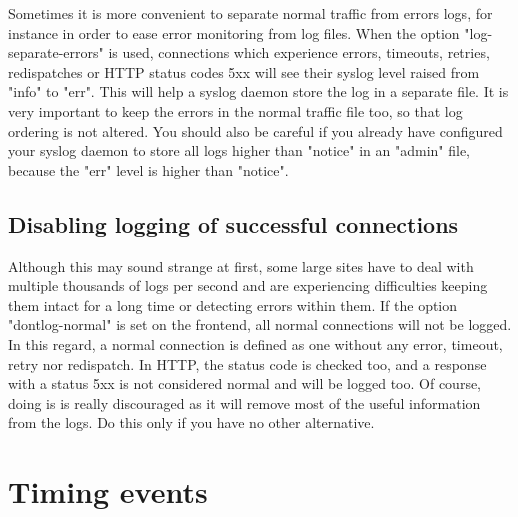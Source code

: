 Sometimes it is more convenient to separate normal traffic from errors logs,
for instance in order to ease error monitoring from log files. When the option
"log-separate-errors" is used, connections which experience errors, timeouts,
retries, redispatches or HTTP status codes 5xx will see their syslog level
raised from "info" to "err". This will help a syslog daemon store the log in
a separate file. It is very important to keep the errors in the normal traffic
file too, so that log ordering is not altered. You should also be careful if
you already have configured your syslog daemon to store all logs higher than
"notice" in an "admin" file, because the "err" level is higher than "notice".

\subsection{Disabling logging of successful connections}

Although this may sound strange at first, some large sites have to deal with
multiple thousands of logs per second and are experiencing difficulties keeping
them intact for a long time or detecting errors within them. If the option
"dontlog-normal" is set on the frontend, all normal connections will not be
logged. In this regard, a normal connection is defined as one without any
error, timeout, retry nor redispatch. In HTTP, the status code is checked too,
and a response with a status 5xx is not considered normal and will be logged
too. Of course, doing is is really discouraged as it will remove most of the
useful information from the logs. Do this only if you have no other
alternative.

\section{Timing events}

